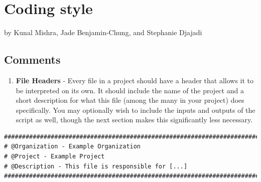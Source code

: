 \documentclass[
]{book}
\providecommand{\tightlist}{%
  \setlength{\itemsep}{0pt}\setlength{\parskip}{0pt}}
\begin{document}
\hypertarget{coding-style}{%
\chapter{Coding style}\label{coding-style}}

by Kunal Mishra, Jade Benjamin-Chung, and Stephanie Djajadi

\hypertarget{comments}{%
\section{Comments}\label{comments}}

\begin{enumerate}
\def\labelenumi{\arabic{enumi}.}
\tightlist
\item
  \textbf{File Headers} - Every file in a project should have a header that allows it to be interpreted on its own. It should include the name of the project and a short description for what this file (among the many in your project) does specifically. You may optionally wish to include the inputs and outputs of the script as well, though the next section makes this significantly less necessary.
\end{enumerate}

\begin{verbatim}
################################################################################
# @Organization - Example Organization
# @Project - Example Project
# @Description - This file is responsible for [...]
################################################################################
\end{verbatim}
\end{document}
